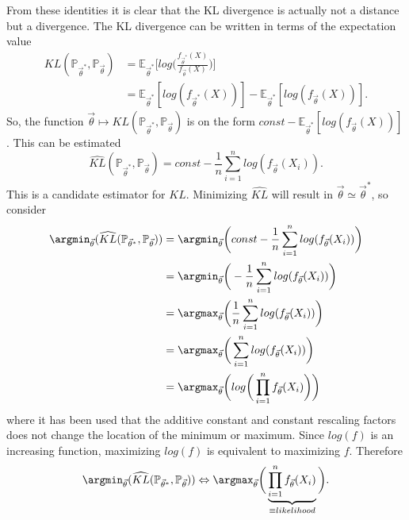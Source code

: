 From these identities it is clear that the KL divergence is actually not a distance but a divergence. The KL divergence can be written in terms of the expectation value
\begin{equation}
	\begin{split}
		KL(\mathbb{P}_{\vec{\theta}^*},\mathbb{P}_{\vec{\theta}})&=\mathbb{E}_{\vec{\theta}^*}\bigg[log\bigg(\frac{f_{\vec{\theta}^*}(X)}{f_{\vec{\theta}}(X)}\bigg)\bigg]\\
		&=\mathbb{E}_{\vec{\theta}^*}[log(f_{\vec{\theta}^*}(X))]-\mathbb{E}_{\vec{\theta}^*}[log(f_{\vec{\theta}}(X))].
	\end{split}
\end{equation}
So, the function $\vec{\theta}\mapsto KL(\mathbb{P}_{\vec{\theta}^*},\mathbb{P}_{\vec{\theta}})$ is on the form $const-\mathbb{E}_{\vec{\theta}^*}[log(f_{\vec{\theta}}(X))]$. This can be estimated 
\begin{equation}
	\widehat{KL}(\mathbb{P}_{\vec{\theta}^*},\mathbb{P}_{\vec{\theta}})=const-\frac{1}{n}\sum_{i=1}^nlog(f_{\vec{\theta}}(X_i)).
\end{equation}
This is a candidate estimator for $KL$. Minimizing $\widehat{KL}$ will result in $\vec{\theta}\simeq \vec{\theta}^*$, so consider
\begin{equation}
	\begin{split}
		\argmin_{\vec{\theta}}(\widehat{KL}(\mathbb{P}_{\vec{\theta}^*},\mathbb{P}_{\vec{\theta}}))&=\argmin_{\vec{\theta}}\bigg(const-\frac{1}{n}\sum_{i=1}^nlog(f_{\vec{\theta}}(X_i))\bigg)\\
		&=\argmin_{\vec{\theta}}\bigg(-\frac{1}{n}\sum_{i=1}^nlog(f_{\vec{\theta}}(X_i))\bigg)\\
		&=\argmax_{\vec{\theta}}\bigg(\frac{1}{n}\sum_{i=1}^nlog(f_{\vec{\theta}}(X_i))\bigg)\\
		&=\argmax_{\vec{\theta}}\bigg(\sum_{i=1}^nlog(f_{\vec{\theta}}(X_i))\bigg)\\
		&=\argmax_{\vec{\theta}}\bigg(log\bigg(\prod_{i=1}^nf_{\vec{\theta}}(X_i)\bigg)\bigg)\\
	\end{split}
\end{equation}
where it has been used that the additive constant and constant rescaling factors does not change the location of the minimum or maximum. Since $log(f)$ is an increasing function, maximizing $log(f)$ is equivalent to maximizing $f$. Therefore
\begin{equation}
	\begin{split}
		\argmin_{\vec{\theta}}(\widehat{KL}(\mathbb{P}_{\vec{\theta}^*},\mathbb{P}_{\vec{\theta}}))\Leftrightarrow \argmax_{\vec{\theta}}\bigg(\underbrace{\prod_{i=1}^nf_{\vec{\theta}}(X_i)}_{\equiv likelihood}\bigg).\\
	\end{split}
\end{equation}
